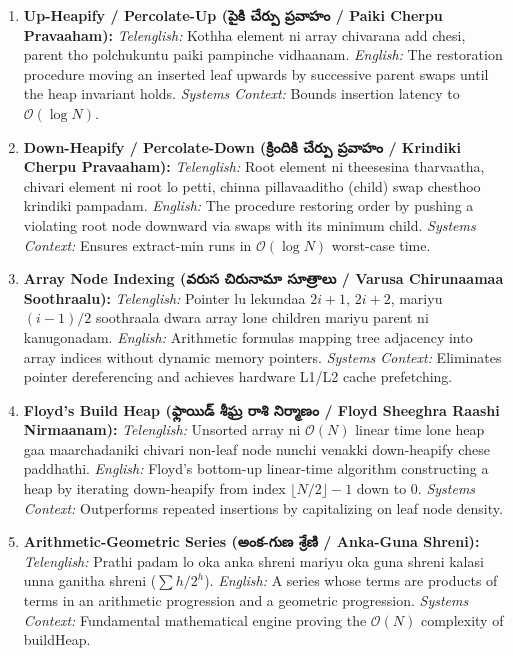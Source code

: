 \documentclass[10pt,twocolumn,letterpaper]{article}
\begin{document}
\begin{enumerate}
    \item \textbf{Up-Heapify / Percolate-Up (పైకి చేర్పు ప్రవాహం / Paiki Cherpu Pravaaham):}
    \textit{Telenglish:} Kothha element ni array chivarana add chesi, parent tho polchukuntu paiki pampinche vidhaanam.
    \textit{English:} The restoration procedure moving an inserted leaf upwards by successive parent swaps until the heap invariant holds.
    \textit{Systems Context:} Bounds insertion latency to $\mathcal{O}(\log N)$.

    \item \textbf{Down-Heapify / Percolate-Down (క్రిందికి చేర్పు ప్రవాహం / Krindiki Cherpu Pravaaham):}
    \textit{Telenglish:} Root element ni theesesina tharvaatha, chivari element ni root lo petti, chinna pillavaaditho (child) swap chesthoo krindiki pampadam.
    \textit{English:} The procedure restoring order by pushing a violating root node downward via swaps with its minimum child.
    \textit{Systems Context:} Ensures extract-min runs in $\mathcal{O}(\log N)$ worst-case time.

    \item \textbf{Array Node Indexing (వరుస చిరునామా సూత్రాలు / Varusa Chirunaamaa Soothraalu):}
    \textit{Telenglish:} Pointer lu lekundaa $2i+1$, $2i+2$, mariyu $(i-1)/2$ soothraala dwara array lone children mariyu parent ni kanugonadam.
    \textit{English:} Arithmetic formulas mapping tree adjacency into array indices without dynamic memory pointers.
    \textit{Systems Context:} Eliminates pointer dereferencing and achieves hardware L1/L2 cache prefetching.

    \item \textbf{Floyd's Build Heap (ఫ్లాయిడ్ శీఘ్ర రాశి నిర్మాణం / Floyd Sheeghra Raashi Nirmaanam):}
    \textit{Telenglish:} Unsorted array ni $\mathcal{O}(N)$ linear time lone heap gaa maarchadaniki chivari non-leaf node nunchi venakki down-heapify chese paddhathi.
    \textit{English:} Floyd's bottom-up linear-time algorithm constructing a heap by iterating down-heapify from index $\lfloor N/2 \rfloor - 1$ down to 0.
    \textit{Systems Context:} Outperforms repeated insertions by capitalizing on leaf node density.

    \item \textbf{Arithmetic-Geometric Series (అంక-గుణ శ్రేణి / Anka-Guna Shreni):}
    \textit{Telenglish:} Prathi padam lo oka anka shreni mariyu oka guna shreni kalasi unna ganitha shreni ($\sum h / 2^h$).
    \textit{English:} A series whose terms are products of terms in an arithmetic progression and a geometric progression.
    \textit{Systems Context:} Fundamental mathematical engine proving the $\mathcal{O}(N)$ complexity of buildHeap.


\end{enumerate}
\end{document}
